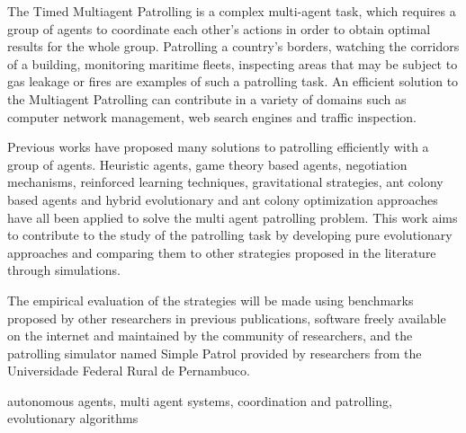 The Timed Multiagent Patrolling is a complex multi-agent task, which requires 
a group of agents to coordinate each other’s actions in order to obtain optimal 
results for the whole group. Patrolling a country’s borders, watching the 
corridors of a building, monitoring maritime fleets, inspecting areas that may be 
subject to gas leakage or fires are examples of such a patrolling task. An 
efficient solution to the Multiagent Patrolling can contribute in a variety of 
domains such as computer network management, web search engines and traffic 
inspection.

Previous works have proposed many solutions to patrolling efficiently with a group 
of agents. Heuristic agents, game theory based agents, negotiation mechanisms, 
reinforced learning techniques, gravitational strategies, 
ant colony based agents and hybrid evolutionary and ant colony optimization approaches have all been applied to 
solve the multi agent patrolling problem. This work aims to contribute to the study 
of the patrolling task by developing pure evolutionary approaches and comparing them 
to other strategies proposed in the literature through simulations.

The empirical evaluation of the strategies will be made using benchmarks proposed by 
other researchers in previous publications, software freely available on the 
internet and maintained by the community of researchers, and the patrolling simulator 
named Simple Patrol provided by researchers from the 
Universidade Federal Rural de Pernambuco.

\begin{keywords}
autonomous agents, multi agent systems, coordination and patrolling, evolutionary 
algorithms
\end{keywords}